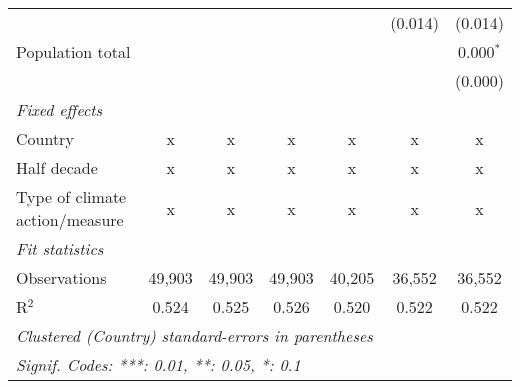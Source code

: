 \begin{tabular}{lcccccc}
                                                                               &              &               &               &                & (0.014)        & (0.014)\\   
   Population total                                                            &              &               &               &                &                & 0.000$^{*}$\\   
                                                                               &              &               &               &                &                & (0.000)\\   
   \emph{Fixed effects}\\
   Country                                                                     & x            & x             & x             & x              & x              & x\\  
   Half decade                                                                 & x            & x             & x             & x              & x              & x\\  
   Type of climate action/measure                                              & x            & x             & x             & x              & x              & x\\  
   \midrule \emph{Fit statistics}\\
   Observations                                                                & 49,903       & 49,903        & 49,903        & 40,205         & 36,552         & 36,552\\  
   R$^2$                                                                       & 0.524        & 0.525         & 0.526         & 0.520          & 0.522          & 0.522\\  
   \midrule
   \multicolumn{7}{l}{\emph{Clustered (Country) standard-errors in parentheses}}\\
   \multicolumn{7}{l}{\emph{Signif. Codes: ***: 0.01, **: 0.05, *: 0.1}}\\
\end{tabular}
\par\endgroup


